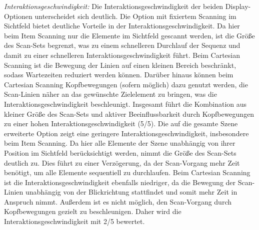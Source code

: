 \textit{Interaktionsgeschwindigkeit:}
Die Interaktionsgeschwindigkeit der beiden Display-Optionen unterscheidet sich deutlich. Die Option mit fixiertem Scanning im Sichtfeld bietet deutliche Vorteile in der Interaktionsgeschwindigkeit. Da hier beim Item Scanning nur die Elemente im Sichtfeld gescannt werden, ist die Größe des Scan-Sets begrenzt, was zu einem schnelleren Durchlauf der Sequenz und damit zu einer schnelleren Interaktionsgeschwindigkeit führt. Beim Cartesian Scanning ist die Bewegung der Linien auf einen kleinen Bereich beschränkt, sodass Wartezeiten reduziert werden können. Darüber hinaus können beim Cartesian Scanning Kopfbewegungen (sofern möglich) dazu genutzt werden, die Scan-Linien näher an das gewünschte Zielelement zu bringen, was die Interaktionsgeschwindigkeit beschleunigt. Insgesamt führt die Kombination aus kleiner Größe des Scan-Sets und aktiver Beeinflussbarkeit durch Kopfbewegungen zu einer hohen Interaktionsgeschwindigkeit (5/5).
Die auf die gesamte Szene erweiterte Option zeigt eine geringere Interaktionsgeschwindigkeit, insbesondere beim Item Scanning. Da hier alle Elemente der Szene unabhängig von ihrer Position im Sichtfeld berücksichtigt werden, nimmt die Größe des Scan-Sets deutlich zu. Dies führt zu einer Verzögerung, da der Scan-Vorgang mehr Zeit benötigt, um alle Elemente sequentiell zu durchlaufen. Beim Cartesian Scanning ist die Interaktionsgeschwindigkeit ebenfalls niedriger, da die Bewegung der Scan-Linien unabhängig von der Blickrichtung stattfindet und somit mehr Zeit in Anspruch nimmt. Außerdem ist es nicht möglich, den Scan-Vorgang durch Kopfbewegungen gezielt zu beschleunigen. Daher wird die Interaktionsgeschwindigkeit mit 2/5 bewertet. 

